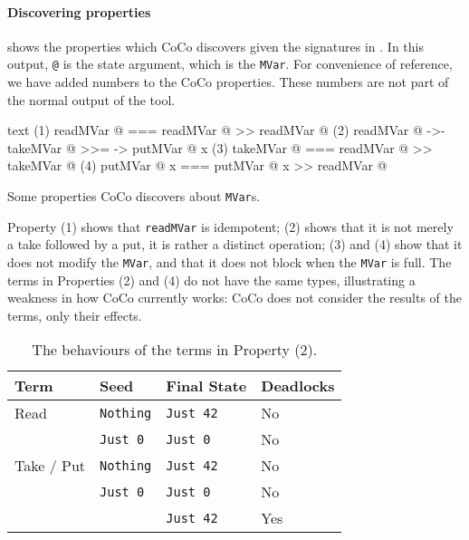 \paragraph{Discovering properties}
 shows the properties which CoCo discovers given
the signatures in .  In this output, \verb|@| is the
state argument, which is the \verb|MVar|.  For convenience of
reference, we have added numbers to the CoCo properties.  These
numbers are not part of the normal output of the tool.

\begin{listing}
\centering
\begin{cminted}{text}
(1)   readMVar @  ===  readMVar @ >> readMVar @
(2)   readMVar @  ->-  takeMVar @ >>= \x -> putMVar @ x
(3)   takeMVar @  ===  readMVar @ >> takeMVar @
(4)  putMVar @ x  ===  putMVar @ x >> readMVar @
\end{cminted}
\caption{Some properties CoCo discovers about \texttt{MVar}s.}\label{lst:mvar_props1}
\end{listing}

Property (1) shows that \verb|readMVar| is idempotent; (2) shows that
it is not merely a take followed by a put, it is rather a distinct
operation; (3) and (4) show that it does not modify the \verb|MVar|,
and that it does not block when the \verb|MVar| is full.  The terms in
Properties (2) and (4) do not have the same types, illustrating a
weakness in how CoCo currently works: CoCo does not consider the
results of the terms, only their effects.

\begin{table}[t]
\centering
\begin{tabular}{p{7.5em}p{7.5em}p{7.5em}p{7.5em}} \toprule
  Term       & Seed           & Final State & Deadlocks \\ \midrule
  Read       & \verb|Nothing| & \verb|Just 42| & No  \\
             & \verb|Just 0|  & \verb|Just 0|  & No  \\
  Take / Put & \verb|Nothing| & \verb|Just 42| & No  \\
             & \verb|Just 0|  & \verb|Just 0|  & No  \\
             &                & \verb|Just 42| & Yes \\ \bottomrule
\end{tabular}
\caption{The behaviours of the terms in Property (2).}
\label{tbl:behaviours}
\end{table}

